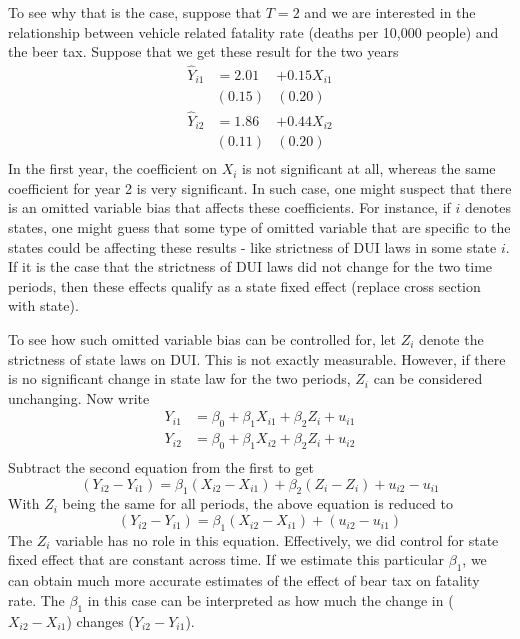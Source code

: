 To see why that is the case, suppose that $T=2$ and we are interested in the relationship between vehicle related fatality rate (deaths per 10,000 people) and the beer tax. Suppose that we get these result for the two years
\[
\begin{aligned}
\hat{Y}_{i1} &=2.01 &+ 0.15X_{i1}\\
                    &(0.15)&(0.20) \\
\hat{Y}_{i2} &=1.86 &+ 0.44X_{i2}\\
                    &(0.11)&(0.20) \\                    
\end{aligned}
\]
In the first year, the coefficient on $X_i$ is not significant at all, whereas the same coefficient for year 2 is very significant. In such case, one might suspect that there is an omitted variable bias that affects these coefficients. For instance, if $i$ denotes states, one might guess that some type of omitted variable that are specific to the states could be affecting these results - like strictness of DUI laws in some state $i$. If it is the case that the strictness of DUI laws did not change for the two time periods, then these effects qualify as a state fixed effect (replace cross section with state). \par\medskip 
To see how such omitted variable bias can be controlled for, let $Z_i$ denote the strictness of state laws on DUI. This is not exactly measurable. However, if there is no significant change in state law for the two periods, $Z_i$ can be considered unchanging. Now write
\[
\begin{aligned}
Y_{i1}& = \beta_0 + \beta_1X_{i1}+\beta_2 Z_{i}+u_{i1} \\                
Y_{i2}& = \beta_0 + \beta_1X_{i2}+\beta_2 Z_{i}+u_{i2} \\                
\end{aligned}
\]
Subtract the second equation from the first to get
\[
(Y_{i2}-Y_{i1}) = \beta_1(X_{i2}-X_{i1}) +\beta_2(Z_{i}-Z_{i}) + u_{i2}-u_{i1}
\]
With $Z_i$ being the same for all periods, the above equation is reduced to
\[
(Y_{i2}-Y_{i1}) = \beta_1(X_{i2}-X_{i1}) +(u_{i2}-u_{i1})
\]
The $Z_i$ variable has no role in this equation. Effectively, we did control for state fixed effect that are constant across time. If we estimate this particular $\beta_1$, we can obtain much more accurate estimates of the effect of bear tax on fatality rate. The $\beta_1$ in this case can be interpreted as how much the change in ($X_{i2}-X_{i1}$) changes ($Y_{i2}-Y_{i1}$). \par\medskip
